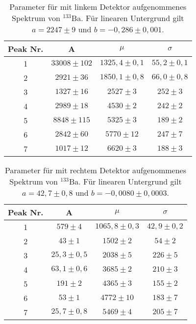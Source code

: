 \begin{table}[h]
\centering
\caption{Parameter für mit linkem Detektor aufgenommenes Spektrum von $^{133}$Ba. Für linearen Untergrund gilt $a= 2247 \pm 9$ und $b=-0,286 \pm 0,001$.}
\label{tab:ba_links}
\begin{tabular}{cccc}
\toprule
Peak Nr. & A & $\mu$ & $\sigma$\\
\midrule
1&	$33008 \pm 102$        &$1325,4 \pm 0,1$&	$55,2 \pm 0,1$\\
2&	$2921 \pm 36$          &$1850,1 \pm 0,8$&	$66,0 \pm 0,8$\\
3&	$1327 \pm 16$          &$2527 \pm 3$&	$252 \pm 3$\\
4&	$2989 \pm 18$          &$4530 \pm 2$&	$242 \pm 2$\\
5&	$8848 \pm 115$         &$5325 \pm 3$&	$189 \pm 2$\\
6&	$2842 \pm 60$          &$5770 \pm 12$&	$247 \pm 7$\\
7&	$1017 \pm 12$           &$6620 \pm 3$&	$188 \pm 3$\\
\bottomrule
\end{tabular}
\end{table}

\begin{table}[h]
\centering
\caption{Parameter für mit rechtem Detektor aufgenommenes Spektrum von $^{133}$Ba. Für linearen Untergrund gilt $a= 42,7 \pm 0,8$ und $b=-0,0080 \pm 0,0003$.}
\label{tab:ba_rechts}
\begin{tabular}{cccc}
\toprule
Peak Nr. & A & $\mu$ & $\sigma$\\
\midrule
1&	$579 \pm 4$        &$1065,8 \pm 0,3$&	$42,9 \pm 0,2$\\
2&	$43 \pm 1$          &$1502 \pm 2$&	$54 \pm 2$\\
3&	$25,3 \pm 0,5$          &$2038 \pm 5$&	$226 \pm 5$\\
4&	$63,1 \pm 0,6$          &$3685 \pm 2$&	$210 \pm 3$\\
5&	$191 \pm 2$         &$4365 \pm 3$&	$155 \pm 2$\\
6&	$53 \pm 1$          &$4772 \pm 10$&	$183 \pm 7$\\
7&	$25,7 \pm 0,8$           &$5469 \pm 4$&	$205 \pm 7$\\
\bottomrule
\end{tabular}
\end{table}
